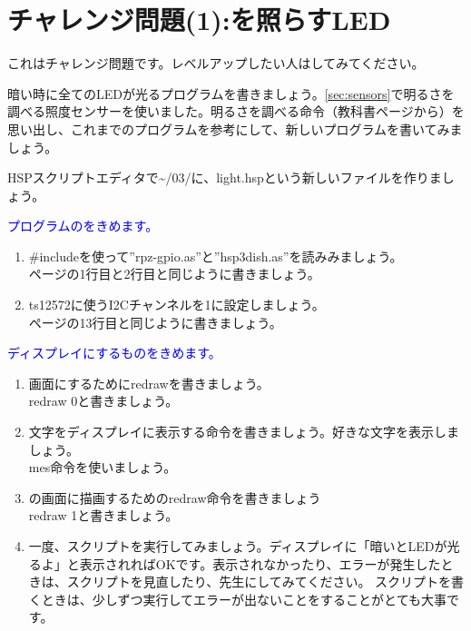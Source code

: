 \section{チャレンジ問題(1):を照らすLED}
これはチャレンジ問題です。レベルアップしたい人はしてみてください。

暗い時に全てのLEDが光るプログラムを書きましょう。\ref{sec:sensors}で明るさを調べる照度センサーを使いました。明るさを調べる命令（教科書\pageref{sec:sensors}ページから）を思い出し、これまでのプログラムを参考にして、新しいプログラムを書いてみましょう。\\
\begin{enumerate}
\renewcommand{\theenumii}{\arabic{enumii}}
\renewcommand{\labelenumii}{\theenumi.\theenumii}
\item HSPスクリプトエディタで\textasciitilde /03/に、light.hspという新しいファイルを作りましょう。
\textcolor{blue}{\item プログラムのをきめます。}
\begin{enumerate}
\item \#includeを使って”rpz-gpio.as”と”hsp3dish.as”を読みみましょう。\\
\pageref{sensors.hsp}ページの1行目と2行目と同じように書きましょう。
\item ts12572に使うI2Cチャンネルを1に設定しましょう。\\
\pageref{sensors.hsp}ページの13行目と同じように書きましょう。
\end{enumerate}
\textcolor{blue}{\item ディスプレイにするものをきめます。}
\begin{enumerate}
\item {}画面にするためにredrawを書きましょう。\\
redraw 0と書きましょう。
\item 文字をディスプレイに表示する命令を書きましょう。好きな文字を表示しましょう。\\
mes命令を使いましょう。
\item {}の画面に描画するためのredraw命令を書きましょう\\
redraw 1と書きましょう。
\item 一度、スクリプトを実行してみましょう。ディスプレイに「暗いとLEDが光るよ」と表示されればOKです。表示されなかったり、エラーが発生したときは、スクリプトを見直したり、先生にしてみてください。
スクリプトを書くときは、少しずつ実行してエラーが出ないことをすることがとても大事です。

\end{enumerate}
\end{enumerate}
